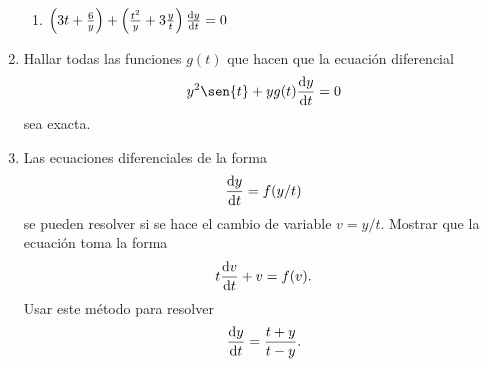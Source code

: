 \documentclass[14pt]{extarticle}
\begin{document}
\begin{enumerate}
{\begin{enumerate}
{                    \color{azul}
                    Modificando la ecuación, tenemos que 
                    \begin{align*}
                        &\implies t\cos{y}\dv{y}{t} = -(t+2)\sen{y} \\
                        &\implies \dv{y}{t} = -\frac{(t+2)\sen{y}}{t\cos{y}} \\
                        &\implies \dv{y}{t} = -\frac{\frac{t+2}{t}}{\cot{y}}
                    \end{align*}
                    Que es de la forma de una ecuación separable. Por lo que, 
                    para resolverla, hay que resolver
                    \begin{align*}
                        &\implies \cot{y} dy = -(1 + \frac{2}{t})dt \\
                        &\implies \int{\cot{y} dy} = -\int{(1 + \frac{2}{t})dt} \\
                        &\implies ln \abs{\sin{y}}= -(t + 2 ln \abs{t}) + C \\
                        &\implies \abs{\sin{y}} = C e^{-(t + 2 ln \abs{t})} \\
                        &\implies \sin{y} = \pm (C e^{-(t + 2 ln \abs{t})}) \\
                        &\implies y = \arcsin (\pm (C e^{-(t + 2 ln \abs{t})}))
                    \end{align*}
                }
                
                \item {
                    $\left(3t+\frac{6}{y}\right)
                    +\left(\frac{t^2}{y}+3\frac{y}{t}\right)\dv{y}{t}=0$

                    \color{azul}
                }
            \end{enumerate}
        }
        
        \item {
            Hallar todas las funciones $g(t)$ que hacen que la ecuación
            diferencial $$y^2\sen{t}+yg(t)\dv{y}{t}=0$$ sea exacta.

            \color{azul}
        }
        
        \item {
            Las ecuaciones diferenciales de la forma $$\dv{y}{t}=f(y/t)$$ se
            pueden resolver si se hace el cambio de variable $v=y/t$. Mostrar
            que la ecuación toma la forma $$t\dv{v}{t}+v=f(v).$$ Usar este
            método para resolver $$\dv{y}{t}=\frac{t+y}{t-y}.$$

}
\end{enumerate}
\end{document}
